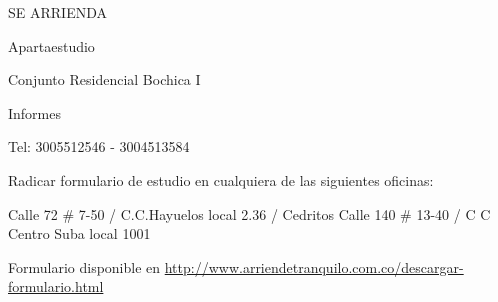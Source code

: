 \documentclass[final]{beamer}
\date{Jul. 31th, 2007}
\begin{document}
  \begin{frame}{}
\centering
  \begin{block}
  \centering
      {\VERYHuge \begin{center}
      SE ARRIENDA
      \end{center}}\par
      {\Large \begin{center}
      Apartaestudio
      \end{center}}\par
      {\large \begin{center}
      Conjunto Residencial Bochica I
      \end{center}}\par
      {\large \begin{center}
      Informes
      \end{center}}\par
      {\Large \begin{center}
      Tel: 3005512546 - 3004513584 \end{center}}\par
      {\normalsize \begin{center}
      Radicar formulario de estudio en cualquiera de las siguientes oficinas:
      \end{center}Calle 72 \# 7-50 / C.C.Hayuelos local 2.36  /  Cedritos Calle 140 \# 13-40 / C C Centro Suba   local 1001}\par \vspace{.25in}
      {\normalsize Formulario disponible en \url{http://www.arriendetranquilo.com.co/descargar-formulario.html}}\par
  \end{block}
  \end{frame}
\end{document}
